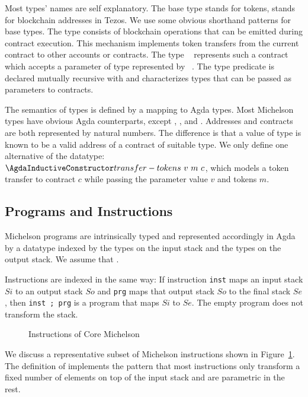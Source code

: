 Most types' names are self explanatory. The base type {\Amutez} stands
for tokens, {\Aaddr} stands for blockchain addresses in  Tezos. We use
some obvious shorthand patterns for base types.
The type {\Aoperation} consists of blockchain operations that can
be emitted during contract execution. This mechanism implements token
transfers from the current contract to other accounts or contracts.
The type {\Acontract~\AP} represents such a contract
which accepts a parameter of type {\Aty} represented by {\APassable~\Aty}.
The type predicate {\TypesPassable} is declared mutually recursive with {\AType}
and characterizes types that can be passed as parameters to contracts.

The semantics of types is defined by a mapping to Agda types. Most
Michelson types have  obvious Agda counterparts, except {\Aaddr},
{\Acontract}, and {\Aoperation}.  Addresses and contracts are both
represented by natural numbers. The difference is that a value of type
{\Acontract} is known to be a valid address of a contract of suitable
type. We only define one alternative of the 
{\AOperation} datatype: {$\AtransferTokens~v~m~c$}, which models a
token transfer to contract $c$ while passing the parameter value $v$
and tokens $m$.

\subsection{Programs and Instructions}
\label{sec:michelson-programs}


Michelson programs are intrinsically typed and represented accordingly in
Agda by a datatype {\AProgram} indexed by the types on the input stack
and the types on the output stack. We assume that \TypesStack.
\SyntaxProgram

Instructions are indexed in the same way:
If  instruction \verb/inst/ maps an input stack $Si$ to an output stack $So$
and \verb/prg/ maps that output stack $So$ to the final stack $Se$,
then \verb/inst ; prg/ is a program that maps $Si$ to $Se$.
The empty program {\Aend} does not transform the stack.

\begin{figure}[tp]
  \SyntaxInstruction  
  \caption{Instructions of Core Michelson}
  \label{fig:core-michelson-instructions}
\end{figure}
We discuss a representative subset of Michelson instructions shown in Figure~\ref{fig:core-michelson-instructions}.
The definition of {\AInstructionPlus} implements the pattern that most
instructions only transform a fixed number of elements on top of the input stack and are parametric in the rest. 

